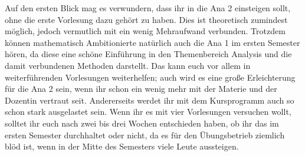 Auf den ersten Blick mag es verwundern, dass ihr in die \gls{Ana} 2 einsteigen sollt, ohne die erste Vorlesung dazu gehört zu haben. Dies ist theoretisch zumindest möglich, jedoch vermutlich mit ein wenig Mehraufwand verbunden. Trotzdem können mathematisch Ambitionierte natürlich auch die \gls{Ana} 1 im ersten Semester hören, da diese eine schöne Einführung in den Themenbereich Analysis und die damit verbundenen Methoden darstellt. Das kann euch vor allem in weiterführenden Vorlesungen weiterhelfen; auch wird es eine große Erleichterung für die \gls{Ana} 2 sein, wenn ihr schon ein wenig mehr mit der Materie und der Dozentin vertraut seit. Andererseits werdet ihr mit dem Kursprogramm auch so schon stark ausgelastet sein. Wenn ihr es mit vier Vorlesungen versuchen wollt, solltet ihr euch nach zwei bis drei Wochen entschieden haben, ob ihr das im ersten Semester durchhaltet oder nicht, da es für den Übungsbetrieb ziemlich blöd ist, wenn in der Mitte des Semesters viele Leute aussteigen.

\begin{figure}[b!]
\end{figure}

